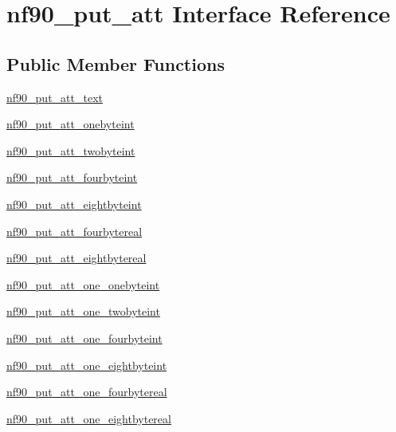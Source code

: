 \hypertarget{interfacenf90__put__att}{}\section{nf90\+\_\+put\+\_\+att Interface Reference}
\label{interfacenf90__put__att}
\subsection*{Public Member Functions}
\begin{DoxyCompactItemize}
\item 
\hyperlink{interfacenf90__put__att_a829bc166119e5ebc1c10cae3b859f21e}{nf90\+\_\+put\+\_\+att\+\_\+text}
\item 
\hyperlink{interfacenf90__put__att_a3bc0763eea9ced9abc6a8dcc1935d3a6}{nf90\+\_\+put\+\_\+att\+\_\+onebyteint}
\item 
\hyperlink{interfacenf90__put__att_aa86c5294d555f3cfed3ad281f8175397}{nf90\+\_\+put\+\_\+att\+\_\+twobyteint}
\item 
\hyperlink{interfacenf90__put__att_add55d3c321005a3541f8f5b20c45eace}{nf90\+\_\+put\+\_\+att\+\_\+fourbyteint}
\item 
\hyperlink{interfacenf90__put__att_a7e15d5d1dfc9e9a323f6159a5b833780}{nf90\+\_\+put\+\_\+att\+\_\+eightbyteint}
\item 
\hyperlink{interfacenf90__put__att_a9c359110b6bc433549469eb3b1dbc9a5}{nf90\+\_\+put\+\_\+att\+\_\+fourbytereal}
\item 
\hyperlink{interfacenf90__put__att_a7dfffc0a1eb4094202ed9d2a3eb5d6c3}{nf90\+\_\+put\+\_\+att\+\_\+eightbytereal}
\item 
\hyperlink{interfacenf90__put__att_ac8320bf5fe144263305d26475bafe363}{nf90\+\_\+put\+\_\+att\+\_\+one\+\_\+onebyteint}
\item 
\hyperlink{interfacenf90__put__att_ae64ecb1aa14b81229b2dddc6e12dce84}{nf90\+\_\+put\+\_\+att\+\_\+one\+\_\+twobyteint}
\item 
\hyperlink{interfacenf90__put__att_a353c9fb37df92be529f0552fe37909e1}{nf90\+\_\+put\+\_\+att\+\_\+one\+\_\+fourbyteint}
\item 
\hyperlink{interfacenf90__put__att_a7944a738b96dfbd8c2a3fa1d920632c5}{nf90\+\_\+put\+\_\+att\+\_\+one\+\_\+eightbyteint}
\item 
\hyperlink{interfacenf90__put__att_a24310d1f2fa16c894b4f2a2deb9d7e47}{nf90\+\_\+put\+\_\+att\+\_\+one\+\_\+fourbytereal}
\item 
\hyperlink{interfacenf90__put__att_a93fa5ecec2dd9e4850b0fdb694c6f763}{nf90\+\_\+put\+\_\+att\+\_\+one\+\_\+eightbytereal}
\end{DoxyCompactItemize}


